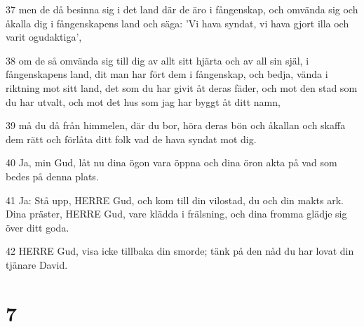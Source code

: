 \par 37 men de då besinna sig i det land där de äro i fångenskap, och omvända sig och åkalla dig i fångenskapens land och säga: 'Vi hava syndat, vi hava gjort illa och varit ogudaktiga',
\par 38 om de så omvända sig till dig av allt sitt hjärta och av all sin själ, i fångenskapens land, dit man har fört dem i fångenskap, och bedja, vända i riktning mot sitt land, det som du har givit åt deras fäder, och mot den stad som du har utvalt, och mot det hus som jag har byggt åt ditt namn,
\par 39 må du då från himmelen, där du bor, höra deras bön och åkallan och skaffa dem rätt och förlåta ditt folk vad de hava syndat mot dig.
\par 40 Ja, min Gud, låt nu dina ögon vara öppna och dina öron akta på vad som bedes på denna plats.
\par 41 Ja: Stå upp, HERRE Gud, och kom till din vilostad, du och din makts ark. Dina präster, HERRE Gud, vare klädda i frälsning, och dina fromma glädje sig över ditt goda.
\par 42 HERRE Gud, visa icke tillbaka din smorde; tänk på den nåd du har lovat din tjänare David.

\chapter{7}

